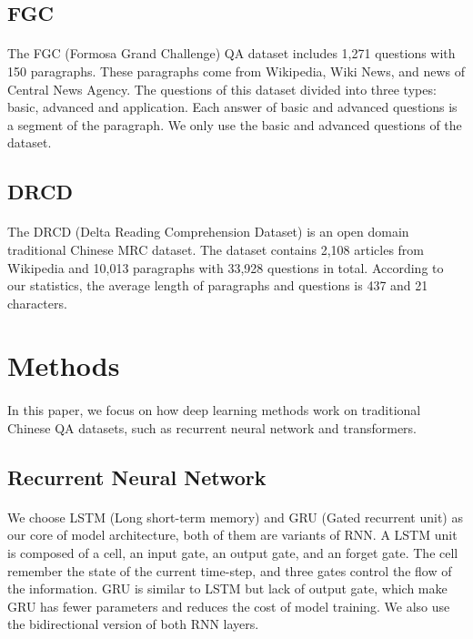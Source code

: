 \documentclass{article}
\begin{document}
\subsection{FGC}
\paragraph{}
The FGC (Formosa Grand Challenge) QA dataset includes 1,271 questions with 150 paragraphs. These paragraphs come from Wikipedia, Wiki News, and news of Central News Agency. The questions of this dataset divided into three types: basic, advanced and application. Each answer of basic and advanced questions is a segment of the paragraph. We only use the basic and advanced questions of the dataset.

\subsection{DRCD}
\paragraph{}
The DRCD\cite{shao2018drcd} (Delta Reading Comprehension Dataset) is an open domain traditional Chinese MRC dataset. The dataset contains 2,108 articles from Wikipedia and 10,013 paragraphs with 33,928 questions in total. According to our statistics, the average length of paragraphs and questions is 437 and 21 characters.

\section{Methods}
\paragraph{}
In this paper, we focus on how deep learning methods work on traditional Chinese QA datasets, such as recurrent neural network and transformers.

\subsection{Recurrent Neural Network}
\paragraph{}
We choose LSTM\cite{hochreiter1997lstm} (Long short-term memory) and GRU\cite{cho2014learning} (Gated recurrent unit) as our core of model architecture, both of them are variants of RNN. A LSTM unit is composed of a cell, an input gate, an output gate, and an forget gate. The cell remember the state of the current time-step, and three gates control the flow of the information. GRU is similar to LSTM but lack of output gate, which make GRU has fewer parameters and reduces the cost of model training. We also use the bidirectional version of both RNN layers.
\end{document}
